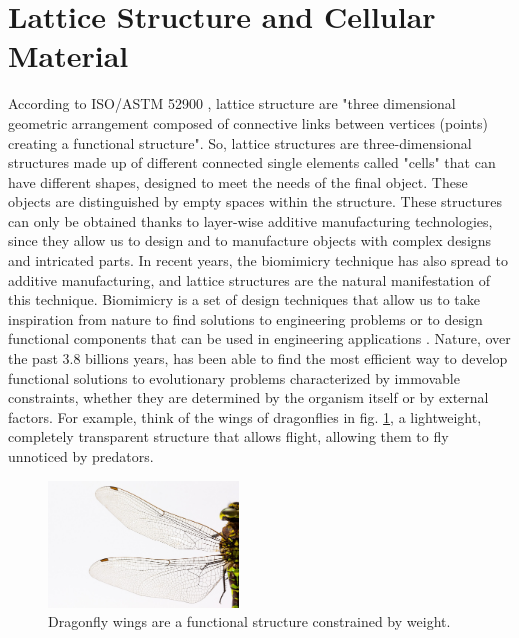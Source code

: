 \section{Lattice Structure and Cellular Material} \label{sec:lattice}
According to ISO/ASTM 52900 \cite{international_standard_organization_isoastm_2015}, lattice structure are "three dimensional geometric arrangement composed of connective links between vertices (points) creating a functional structure". So, lattice structures are three-dimensional structures made up of different connected single elements called "cells" that can have different shapes, designed to meet the needs of the final object. These objects are distinguished by empty spaces within the structure. These structures can only be obtained thanks to layer-wise additive manufacturing technologies, since they allow us to design and to manufacture objects with complex designs and intricated parts. In recent years, the biomimicry technique has also spread to additive manufacturing, and lattice structures are the natural manifestation of this technique. Biomimicry is a set of design techniques that allow us to take inspiration from nature to find solutions to engineering problems or to design functional components that can be used in engineering applications \cite{pathak_biomimicry_2019, du_plessis_beautiful_2019}. Nature, over the past 3.8 billions years, has been able to find the most efficient way to develop functional solutions to evolutionary problems characterized by immovable constraints, whether they are determined by the organism itself or by external factors. For example, think of the wings of dragonflies in fig. \ref{fig:dragonfly}, a lightweight, completely transparent structure that allows flight, allowing them to fly unnoticed by predators. 
\begin{figure}[H]
    \centering
    \includegraphics[width=0.45\textwidth]{Images/dragonfly-gf80b992d6_1280.jpg}
    \caption[Dragonfly wings.]{Dragonfly wings are a functional structure constrained by weight.}
    \label{fig:dragonfly}
\end{figure}
